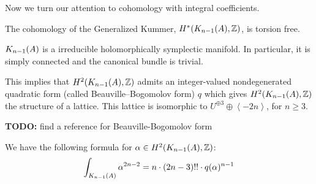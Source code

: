 Now we turn our attention to cohomology with integral coefficients.
\begin{theorem} \cite[Theorem 2]{Spanier}\label{torsion}
The cohomology of the Generalized Kummer, $H^*(\kum{A}{n-1},\Z)$, is torsion free. 
\end{theorem}

\begin{theorem}\cite[Th\'eor\`eme 4]{Beauville}
$\kum{A}{n-1}$ is a irreducible holomorphically symplectic manifold. In particular, it is simply connected and the canonical bundle is trivial.
\end{theorem}
This implies that $H^2(\kum{A}{n-1},\Z)$ admits an integer-valued nondegenerated quadratic form (called Beauville--Bogomolov form) $q$ which gives $H^2(\kum{A}{n-1},\Z)$ the structure of a lattice. This lattice is
isomorphic to $U^{\oplus 3}\oplus \left< -2n \right>$, for $n\geq 3$. 

\textbf{TODO:} find a reference for Beauville-Bogomolov form

We have the following formula for $\alpha\in H^2(\kum{A}{n-1},\Z)$:
\begin{equation} \label{fujiki}
\int_{\kum{A}{n-1}} \alpha^{2n-2} = n\cdot(2n-3)!!\cdot q(\alpha)^{n-1}
\end{equation}



